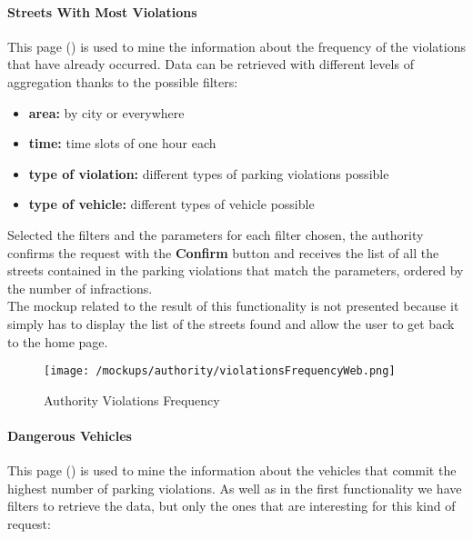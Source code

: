 				\paragraph{Streets With Most Violations}
				This page () is used to mine the information about the frequency of the violations that have already occurred. Data can be retrieved with different levels of aggregation thanks to the possible filters:
				
				\begin{itemize}
					\item \textbf{area:} by city or everywhere
					\item \textbf{time:} time slots of one hour each
					\item \textbf{type of violation:} different types of parking violations possible
					\item \textbf{type of vehicle:} different types of vehicle possible
				\end{itemize}
			
				Selected the filters and the parameters for each filter chosen, the authority confirms the request with the \textbf{Confirm} button and receives the list of all the streets contained in the parking violations  that match the parameters, ordered by the number of infractions.\\
				
				The mockup related to the result of this functionality is not presented because it simply has to display the list of the streets found and allow the user to get back to the home page.
				
				\vspace{0.1cm}
				
				\begin{figure}[ht!]
					\centering
					\texttt{[image: /mockups/authority/violationsFrequencyWeb.png]}
					\caption{\label{fig:violationsFrequencyWeb} Authority Violations Frequency}
				\end{figure}
				
				\paragraph{Dangerous Vehicles}
				This page () is used to mine the information about the vehicles that commit the highest number of parking violations. As well as in the first functionality we have filters to retrieve the data, but only the ones that are interesting for this kind of request:
				
